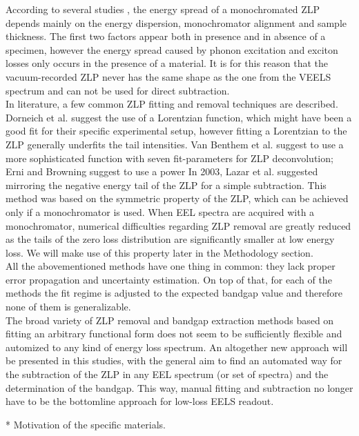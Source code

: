 \documentclass[11pt,a4paper]{article}
\numberwithin{equation}{section}
\numberwithin{figure}{section}
\numberwithin{table}{section}
\begin{document}
According to several studies \cite{Park:2008, Stoger:2008}, the energy spread of a monochromated ZLP depends mainly on the energy dispersion, monochromator alignment and sample thickness. The first two factors appear both in presence and in absence of a specimen, however the energy spread caused by phonon excitation and exciton losses only occurs in the presence of a material. It is for this reason that the vacuum-recorded ZLP never has the same shape as the one from the VEELS spectrum and can not be used for direct subtraction. \\ 
In literature, a few common ZLP fitting and removal techniques are described. Dorneich et al. \cite{Dorneich:1998} suggest the use of a Lorentzian function, which might have been a good fit for their specific experimental setup, however fitting a Lorentzian to the ZLP generally underfits the tail intensities. Van Benthem et al. \cite{Benthem:2001} suggest to use a more sophisticated function with seven fit-parameters for ZLP deconvolution; Erni and Browning \cite{Erni:2005} suggest to use a power 
In 2003, Lazar et al. \cite{Lazar:2003} suggested mirroring the negative energy tail of the ZLP for a simple subtraction. This method was based on the symmetric property of the ZLP, which can be achieved only if a monochromator is used. When EEL spectra are acquired with a monochromator, numerical difficulties regarding ZLP removal are greatly reduced as the tails of the zero loss distribution are significantly smaller at low energy loss. We will make use of this property later in the Methodology section.\\
All the abovementioned methods have one thing in common: they lack proper error propagation and uncertainty estimation. On top of that, for each of the methods the fit regime is adjusted to the expected bandgap value and therefore none of them is generalizable. \\

The broad variety of ZLP removal and bandgap extraction methods based on fitting an arbitrary functional form does not seem to be sufficiently flexible and automized to any kind of energy loss spectrum. An altogether new approach will be presented in this studies, with the general aim to find an automated way for the subtraction of the ZLP in any EEL spectrum (or set of spectra) and the determination of the bandgap. This way, manual fitting and subtraction no longer have to be the bottomline approach for low-loss EELS readout. 

* Motivation of the specific materials.
\end{document}
